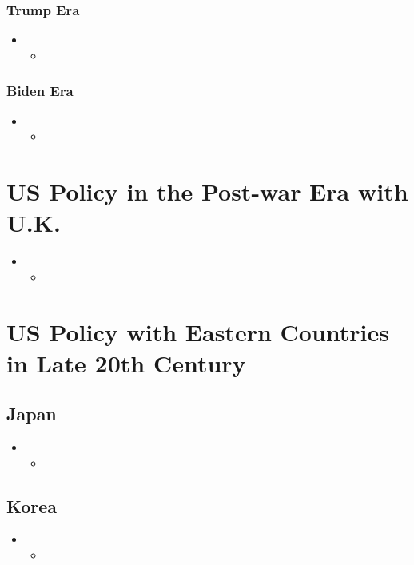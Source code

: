 \documentclass[12pt]{article} %
\begin{document}
		\subsubsection{Trump Era}
			\begin{itemize}
			\item	
				\begin{itemize}
				\item	
				\end{itemize}
			\end{itemize}
		\subsubsection{Biden Era}
			\begin{itemize}
			\item	
				\begin{itemize}
				\item	
				\end{itemize}
			\end{itemize}
	
\section{US Policy in the Post-war Era with U.K.}
		\begin{itemize}
		\item	
			\begin{itemize}
				\item	
			\end{itemize}
		\end{itemize}
		

\section{US Policy with Eastern Countries in Late 20th Century}
	\subsection{Japan}
		\begin{itemize}
		\item	
			\begin{itemize}
				\item	
			\end{itemize}
		\end{itemize}
		
	\subsection{Korea}
		\begin{itemize}
		\item	
			\begin{itemize}
				\item	
			\end{itemize}
		\end{itemize}
		
\end{document}
